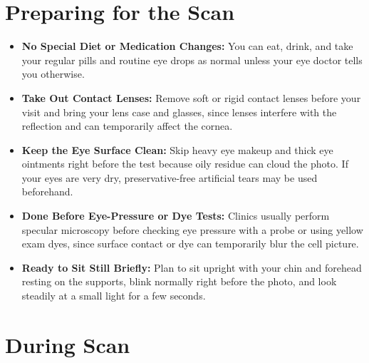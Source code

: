 \section{Preparing for the Scan}

\begin{itemize}
    \item \textbf{No Special Diet or Medication Changes:} You can eat, drink, and take your regular pills and routine eye drops as normal unless your eye doctor tells you otherwise.
    \item \textbf{Take Out Contact Lenses:} Remove soft or rigid contact lenses before your visit and bring your lens case and glasses, since lenses interfere with the reflection and can temporarily affect the cornea.
    \item \textbf{Keep the Eye Surface Clean:} Skip heavy eye makeup and thick eye ointments right before the test because oily residue can cloud the photo. If your eyes are very dry, preservative-free artificial tears may be used beforehand.
    \item \textbf{Done Before Eye-Pressure or Dye Tests:} Clinics usually perform specular microscopy before checking eye pressure with a probe or using yellow exam dyes, since surface contact or dye can temporarily blur the cell picture.
    \item \textbf{Ready to Sit Still Briefly:} Plan to sit upright with your chin and forehead resting on the supports, blink normally right before the photo, and look steadily at a small light for a few seconds.
\end{itemize}

\section{During Scan}

